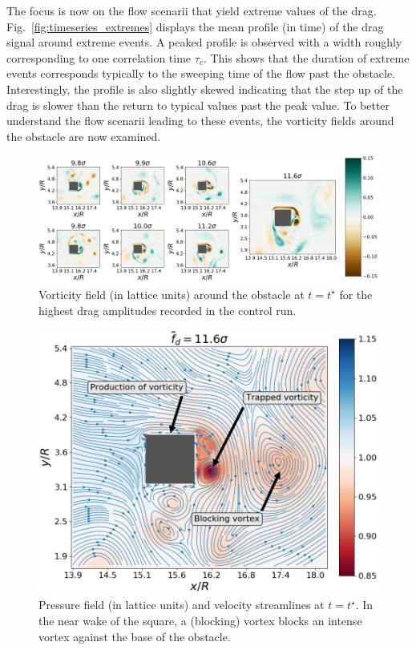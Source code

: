 \documentclass{jfm}
\newcommand{\EL}[1]{{\color{myred}{#1}}}
\begin{document}
%
The focus is now on the flow scenarii that yield extreme values of the drag. 
Fig.~\ref{fig:timeseries_extremes} displays the mean profile (in time) of the drag signal around extreme events. A peaked profile is observed with a width roughly corresponding to one correlation time $\tau_c$. This shows that the duration of extreme events corresponds typically to the sweeping time of the flow past the obstacle. 
Interestingly, the profile is also slightly skewed indicating that the step up of the drag is slower than the return to typical values past the peak value.
\EL{This asymmetry (under time reversal) is closely linked to the symmetry breaking in what happens before and after the obstacle.}
To better understand the flow scenarii leading to these events, the vorticity fields around the obstacle are now examined.

\begin{figure}
	\centering
	\includegraphics[width=\linewidth]{illustr_extrms_vorticity/illustr_extrms_vorticity.png}
	\caption{\label{fig:top_4_events_vorticity} Vorticity field (in lattice units) around the obstacle at $t=t^{\star}$ for the highest drag amplitudes recorded in the control run.
	}
\end{figure}

\begin{figure}
	\centering
	\includegraphics[width=.5\linewidth]{illustr_density_streamlines/illustr_density_streamlines.png}
	\caption{\label{fig:density+streamlines} Pressure field (in lattice units) and velocity streamlines at $t=t^{\star}$. In the near wake of the square, a (blocking) vortex blocks an intense vortex against the base of the obstacle.}
\end{figure}
\end{document}
